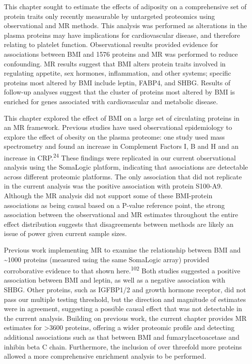 \documentclass[11pt,twoside]{bristolthesis}
\begin{document}
This chapter sought to estimate the effects of adiposity on a comprehensive set of protein traits only recently measurable by untargeted proteomics using observational and MR methods. This analysis was performed as alterations in the plasma proteins may have implications for cardiovascular disease, and therefore relating to platelet function. Observational results provided evidence for associations between BMI and 1576 proteins and MR was performed to reduce confounding. MR results suggest that BMI alters protein traits involved in regulating appetite, sex hormones, inflammation, and other systems; specific proteins most altered by BMI include leptin, FABP4, and SHBG. Results of follow-up analyses suggest that the cluster of proteins most altered by BMI is enriched for genes associated with cardiovascular and metabolic disease.

This chapter explored the effect of BMI on a large set of circulating proteins in an MR framework. Previous studies have used observational epidemiology to explore the effect of obesity on the plasma proteome: one study used mass spectrometry and found an increase in Complement Factors I, B and H and an increase in CRP.\textsuperscript{24} These findings were replicated in our current observational analysis using the SomaLogic platform, indicating that associations are detectable across different proteomic platforms. The only association that did not replicate in the current analysis was the positive association with protein S100-A9. Although the MR analysis did not support some of these BMI-protein associations as being causal based on a P-value reference point, the strong association between the observational and MR estimates throughout the entire effect distribution suggests that disagreements between methods are likely an issue of power given current sample sizes.

Previous work implementing MR to examine the relationship between BMI and \textasciitilde1000 proteins (measured using the same SomaLogic array) provided corroborative evidence to that shown here.\textsuperscript{102} Both studies suggested a positive association between BMI and leptin, as well as a negative association with SHBG. Other proteins, such as IGFBP1/2 and growth hormone receptor, did not pass our multiple testing threshold, but the direction and magnitude of estimates were in agreement, suggesting a possible causal effect that was not detectable in the current analysis. Building on previous work, the current chapter provides MR estimates for \textgreater3600 proteins, offering a wider proteomic profile and detecting additional associations such as that between BMI and fumarylacetoacetase and inhibin beta C chain. Furthermore, the inclusion of over threefold more proteins allowed a more comprehensive enrichment analysis to be performed.
\end{document}
